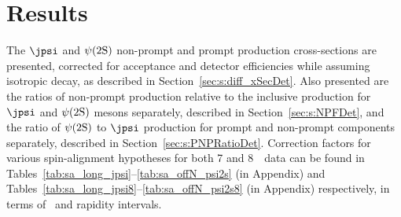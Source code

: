 \section{Results}
\label{sec:results}


The $\jpsi$ and $\psi(2\mathrm{S})$ non-prompt and prompt production cross-sections are presented, corrected for acceptance and detector efficiencies 
while assuming isotropic decay, as described in Section~\ref{sec:s:diff_xSecDet}. 
Also presented are the ratios of non-prompt production relative to the inclusive production for $\jpsi$ and $\psi(2\mathrm{S})$ mesons separately, described in Section~\ref{sec:s:NPFDet},
and the ratio of $\psi(2\mathrm{S})$ to $\jpsi$ production for prompt and non-prompt components separately, described in Section~\ref{sec:s:PNPRatioDet}.
Correction factors for various spin-alignment hypotheses for both 7 and 8~\TeV\  data can be found in 
Tables~\ref{tab:sa_long_jpsi}--\ref{tab:sa_offN_psi2s} (in Appendix) and Tables~\ref{tab:sa_long_jpsi8}--\ref{tab:sa_offN_psi2s8} (in Appendix) respectively, in terms of 
\pt\ and rapidity intervals.



